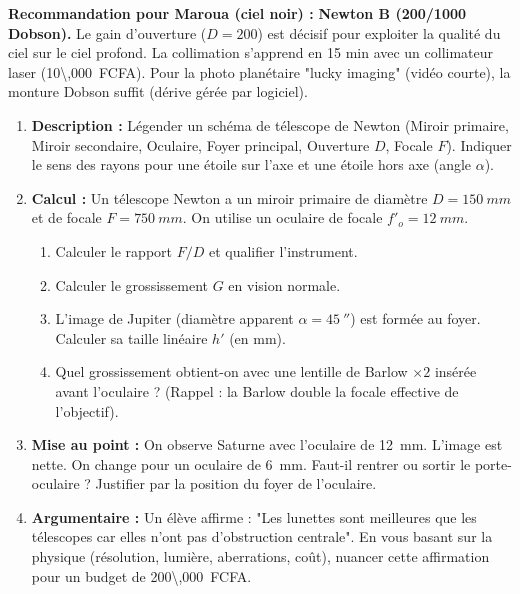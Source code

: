 \documentclass[11pt]{article}
\begin{document}
\begin{exoresolu}
\begin{enumerate}
\end{enumerate}
\textbf{Recommandation pour Maroua (ciel noir) :} \textbf{Newton B (200/1000 Dobson).} Le gain d'ouverture ($D=200$) est décisif pour exploiter la qualité du ciel sur le ciel profond. La collimation s'apprend en 15 min avec un collimateur laser (\SI{10\,000}{FCFA}). Pour la photo planétaire "lucky imaging" (vidéo courte), la monture Dobson suffit (dérive gérée par logiciel).
\end{exoresolu}

\begin{exercice}
\begin{enumerate}
    \item \textbf{Description :} Légender un schéma de télescope de Newton (Miroir primaire, Miroir secondaire, Oculaire, Foyer principal, Ouverture $D$, Focale $F$). Indiquer le sens des rayons pour une étoile sur l'axe et une étoile hors axe (angle $\alpha$).
    \item \textbf{Calcul :} Un télescope Newton a un miroir primaire de diamètre $D = \SI{150}{mm}$ et de focale $F = \SI{750}{mm}$. On utilise un oculaire de focale $f'_o = \SI{12}{mm}$.
    \begin{enumerate}
        \item Calculer le rapport $F/D$ et qualifier l'instrument.
        \item Calculer le grossissement $G$ en vision normale.
        \item L'image de Jupiter (diamètre apparent $\alpha = \SI{45}{''}$) est formée au foyer. Calculer sa taille linéaire $h'$ (en mm).
        \item Quel grossissement obtient-on avec une lentille de Barlow $\times 2$ insérée avant l'oculaire ? (Rappel : la Barlow double la focale effective de l'objectif).
    \end{enumerate}
    \item \textbf{Mise au point :} On observe Saturne avec l'oculaire de \SI{12}{mm}. L'image est nette. On change pour un oculaire de \SI{6}{mm}. Faut-il rentrer ou sortir le porte-oculaire ? Justifier par la position du foyer de l'oculaire.
    \item \textbf{Argumentaire :} Un élève affirme : "Les lunettes sont meilleures que les télescopes car elles n'ont pas d'obstruction centrale". En vous basant sur la physique (résolution, lumière, aberrations, coût), nuancer cette affirmation pour un budget de \SI{200\,000}{FCFA}.
\end{enumerate}
\end{exercice}
\end{document}
